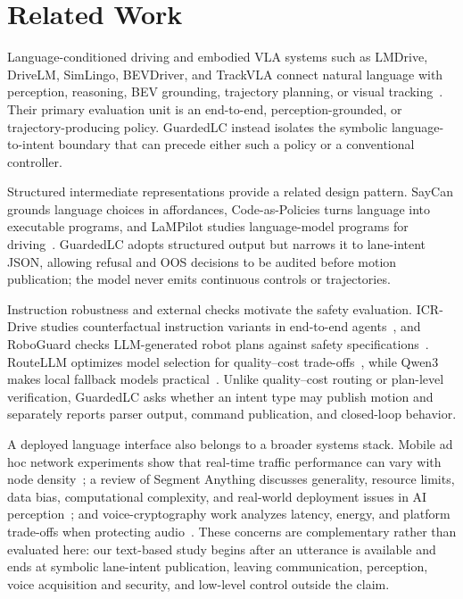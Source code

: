 \documentclass[conference]{IEEEtran}
\newcommand{\ours}{GuardedLC}
\begin{document}
\section{Related Work}
Language-conditioned driving and embodied VLA systems such as LMDrive, DriveLM, SimLingo, BEVDriver, and TrackVLA connect natural language with perception, reasoning, BEV grounding, trajectory planning, or visual tracking~\cite{lmdrive,drivelm,simlingo,bevdriver,trackvla}. Their primary evaluation unit is an end-to-end, perception-grounded, or trajectory-producing policy. \ours{} instead isolates the symbolic language-to-intent boundary that can precede either such a policy or a conventional controller.

Structured intermediate representations provide a related design pattern. SayCan grounds language choices in affordances, Code-as-Policies turns language into executable programs, and LaMPilot studies language-model programs for driving~\cite{saycan,codeaspolicies,lampilot}. \ours{} adopts structured output but narrows it to lane-intent JSON, allowing refusal and OOS decisions to be audited before motion publication; the model never emits continuous controls or trajectories.

Instruction robustness and external checks motivate the safety evaluation. ICR-Drive studies counterfactual instruction variants in end-to-end agents~\cite{icrdrive}, and RoboGuard checks LLM-generated robot plans against safety specifications~\cite{roboguard}. RouteLLM optimizes model selection for quality--cost trade-offs~\cite{routellm}, while Qwen3 makes local fallback models practical~\cite{qwen3}. Unlike quality--cost routing or plan-level verification, \ours{} asks whether an intent type may publish motion and separately reports parser output, command publication, and closed-loop behavior.

A deployed language interface also belongs to a broader systems stack. Mobile ad hoc network experiments show that real-time traffic performance can vary with node density~\cite{manet_density}; a review of Segment Anything discusses generality, resource limits, data bias, computational complexity, and real-world deployment issues in AI perception~\cite{segment_review}; and voice-cryptography work analyzes latency, energy, and platform trade-offs when protecting audio~\cite{voice_aes}. These concerns are complementary rather than evaluated here: our text-based study begins after an utterance is available and ends at symbolic lane-intent publication, leaving communication, perception, voice acquisition and security, and low-level control outside the claim.
\end{document}
